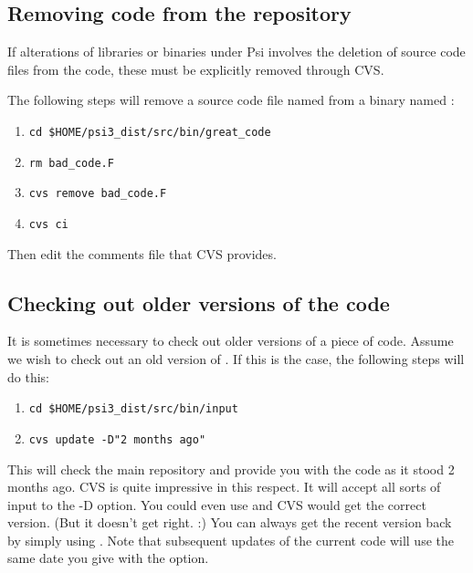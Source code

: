 \subsection{Removing code from the repository}
If alterations of libraries or binaries under Psi involves the deletion of source
code files from the code, these must be explicitly removed through CVS.

The following steps will remove a source code file named  from a
binary named :
\begin{enumerate}
\item {\tt cd \$HOME/psi3\_dist/src/bin/great\_code}
\item {\tt rm bad\_code.F}
\item {\tt cvs remove bad\_code.F}
\item {\tt cvs ci}
\end{enumerate}
Then edit the comments file that CVS provides. 

\subsection{Checking out older versions of the code}
It is sometimes necessary to check out older versions of a piece of code.
Assume we wish to check out an old version of \PSIinput. If this
is the case, the following steps will do this:
\begin{enumerate}
\item {\tt cd \$HOME/psi3\_dist/src/bin/input}
\item {\tt cvs update -D"2 months ago"}
\end{enumerate}
This will check the main repository and provide you with the code as it stood 2
months ago. CVS is quite impressive in this respect. It will accept all sorts of
input to the -D option. You could even use  and CVS
would get the correct version. (But it doesn't get  right.
:) You can always get the recent version back by simply using . Note
that subsequent updates of the current code will use the same date you give
with the  option. 

